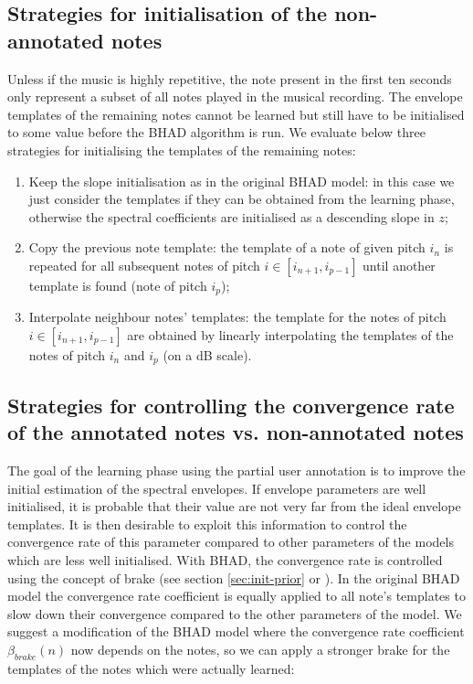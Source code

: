 \documentclass{article}
\begin{document}
\subsection{Strategies for initialisation of the non-annotated notes}

Unless if the music is highly repetitive, the note present in the first ten seconds only represent a subset of all notes played in the musical recording. The envelope templates of the remaining notes cannot be learned but still have to be initialised to some value before the BHAD algorithm is run. We evaluate below three strategies for initialising the templates of the remaining notes:

\begin{enumerate}
\item Keep the slope initialisation as in the original BHAD model: in this case we just consider the templates if they can be obtained from the learning phase, otherwise the spectral coefficients are initialised as a descending slope in $z$;
\item Copy the previous note template: the template of a note of given pitch $i_n$ is repeated for all subsequent notes of pitch $i \in [i_{n+1}, i_{p-1}]$ until another template is found (note of pitch $i_p$);
\item Interpolate neighbour notes' templates: the template for the notes of pitch $i \in [i_{n+1}, i_{p-1}]$ are obtained by linearly interpolating the templates of the notes of pitch $i_n$ and $i_p$ (on a dB scale).
\end{enumerate}

\subsection{Strategies for controlling the convergence rate of the annotated notes vs. non-annotated notes}

The goal of the learning phase using the partial user annotation is to improve the initial estimation of the spectral envelopes. If envelope parameters are well initialised, it is probable that their value are not very far from the ideal envelope templates.  It is then desirable to exploit this information to control the convergence rate of this parameter compared to other parameters of the models which are less well initialised. With BHAD, the convergence rate is controlled using the concept of brake (see section \ref{sec:init-prior} or \cite{Fuentes2012_EUSIPCO}). In the original BHAD model the convergence rate coefficient is equally applied to all note's templates to slow down their convergence compared to the other parameters of the model.  %
We suggest a modification of the BHAD model where the convergence rate coefficient $\beta_{brake}(n)$ now depends on the notes, so we can apply a stronger brake for the templates of the notes which were actually learned:
\end{document}
